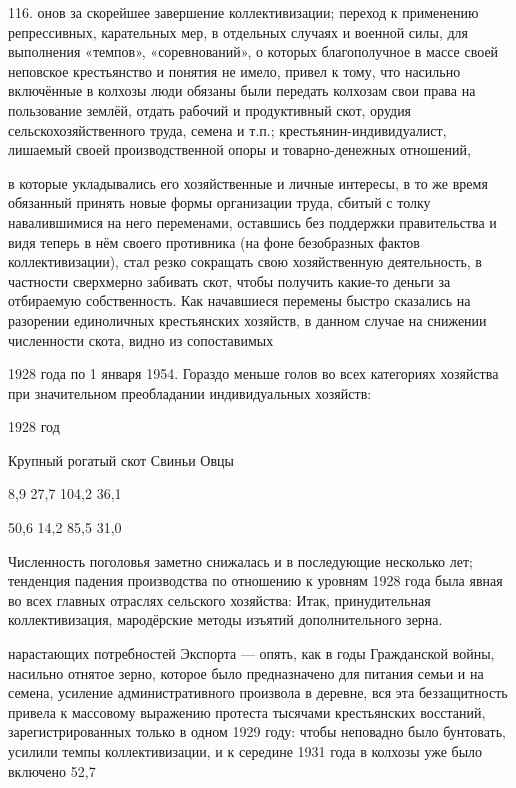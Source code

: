 116. онов за скорейшее завершение коллективизации; переход к применению репрессивных, карательных мер, в отдельных случаях и военной силы, для выполнения «темпов», «соревнований», о которых благополучное в массе своей неповское крестьянство и понятия не имело, привел к тому, что насильно включённые в колхозы люди обязаны были передать колхозам свои права на пользование землёй, отдать рабочий и продуктивный скот, орудия сельскохозяйственного труда, семена и т.п.; крестьянин-индивидуалист, лишаемый своей производственной опоры и товарно-денежных отношений,

в которые укладывались его хозяйственные и личные интересы, в то же время обязанный принять новые формы организации труда, сбитый с толку навалившимися на него переменами, оставшись без поддержки правительства и видя теперь в нём своего противника (на фоне безобразных фактов коллективизации), стал резко сокращать свою хозяйственную деятельность, в частности сверхмерно забивать скот, чтобы получить какие-то деньги за отбираемую собственность. Как начавшиеся перемены быстро сказались на разорении единоличных крестьянских хозяйств, в данном случае на снижении численности скота, видно из сопоставимых

1928 года по 1 января 1954. Гораздо меньше голов во всех категориях хозяйства при значительном преобладании индивидуальных хозяйств:

1928 год

Крупный рогатый скот Свиньи Овцы

8,9 27,7 104,2 36,1

50,6 14,2 85,5 31,0

Численность поголовья заметно снижалась и в последующие несколько лет; тенденция падения производства по отношению к уровням 1928 года была явная во всех главных отраслях сельского хозяйства: Итак, принудительная коллективизация, мародёрские методы изъятий дополнительного зерна.

нарастающих потребностей Экспорта — опять, как в годы Гражданской войны, насильно отнятое зерно, которое было предназначено для питания семьи и на семена, усиление административного произвола в деревне, вся эта беззащитность привела к массовому выражению протеста тысячами крестьянских восстаний, зарегистрированных только в одном 1929 году: чтобы неповадно было бунтовать, усилили темпы коллективизации, и к середине 1931 года в колхозы уже было включено 52,7%

